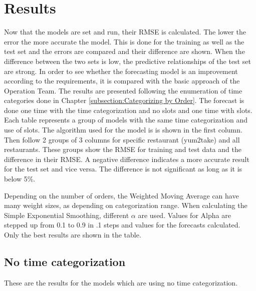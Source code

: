 \chapter{Results}\label{chapter:Results}
Now that the models are set and run, their RMSE is calculated. The lower the error the more accurate the model. This is done for the training as well as the test set and the errors are compared and their difference are shown. When the difference between the two sets is low, the predictive relationships of the test set are strong.\newline
In order to see whether the forecasting model is an improvement according to the requirements, it is compared with the basic approach of the Operation Team.\newline
The results are presented following the enumeration of time categories done in Chapter \ref{subsection:Categorizing by Order}. The forecast is done one time with the time categorization and no slots and one time with slots.\newline
Each table represents a group of models with the same time categorization and use of slots. The algorithm used for the model is is shown in the first column. Then follow 2 groups of 3 columns for specific restaurant (yum2take) and all restaurants. These groups show the RMSE for training and test data and the difference in their RMSE. A negative difference indicates a more accurate result for the test set and vice versa. The difference is not significant as long as it is below 5\%.\newline

Depending on the number of orders, the Weighted Moving Average can have many weight sizes, as depending on categorization range. When calculating the Simple Exponential Smoothing, different $\alpha$ are used. Values for Alpha are stepped up from 0.1 to 0.9 in .1 steps and values for the forecasts calculated. Only the best results are shown in the table.
\section{No time categorization}\label{section:No time categorization}
These are the results for the models which are using no time categorization.
